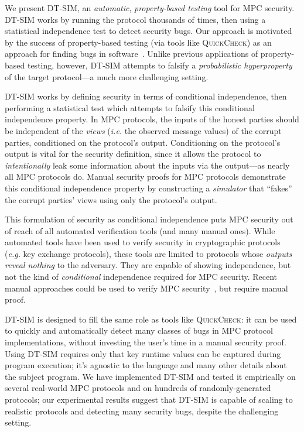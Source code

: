 \documentclass[acmlarge, manuscript, screen, review, anonymous, table]{acmart}
\newcommand{\eg}{\textit{e.g.}\xspace}
\newcommand{\ie}{\textit{i.e.}\xspace}
\newcommand{\toolname}{\textsc{DT-SIM}\xspace}
\begin{document}
We present \toolname, an \emph{automatic}, \emph{property-based testing} tool for MPC security. \toolname works by running the protocol thousands of times, then using a statistical independence test to detect security bugs. Our approach is motivated by the success of property-based testing (via tools like \textsc{QuickCheck}) as an approach for finding bugs in software~\cite{fink1997property, claessen2000quickcheck, paraskevopoulou2015foundational}. Unlike previous applications of property-based testing, however, \toolname attempts to falsify a \emph{probabilistic hyperproperty} of the target protocol---a much more challenging setting.

\toolname works by defining security in terms of conditional independence, then performing a statistical test which attempts to falsify this conditional independence property. In MPC protocols, the inputs of the honest parties should be independent of the \emph{views} (\ie the observed message values) of the corrupt parties, conditioned on the protocol's output. Conditioning on the protocol's output is vital for the security definition, since it allows the protocol to \emph{intentionally} leak some information about the inputs via the output---as nearly all MPC protocols do. Manual security proofs for MPC protocols demonstrate this conditional independence property by constructing a \emph{simulator} that ``fakes'' the corrupt parties' views using only the protocol's output.

This formulation of security as conditional independence puts MPC security out of reach of all automated verification tools (and many manual ones). While automated tools have been used to verify security in cryptographic protocols~\cite{gancher2023owl, barthe2019probabilistic, darais2019language, fournet2011information}  (\eg key exchange protocols), these tools are limited to protocols whose \emph{outputs reveal nothing} to the adversary. They are capable of showing independence, but not the kind of \emph{conditional} independence required for MPC security. Recent manual approaches could be used to verify MPC security~\cite{li2023lilac, gancher2023core, haagh2018computer}, but require manual proof.

\toolname is designed to fill the same role as tools like \textsc{QuickCheck}: it can be used to quickly and automatically detect many classes of bugs in MPC protocol implementations, without investing the user's time in a manual security proof.
Using \toolname requires only that key runtime values can be captured during program execution;
it's agnostic to the language and many other details about the subject program.
We have implemented \toolname and tested it empirically on several real-world MPC protocols and on hundreds of randomly-generated protocols; our experimental results suggest that \toolname is capable of scaling to realistic protocols and detecting many security bugs, despite the challenging setting.
\end{document}

